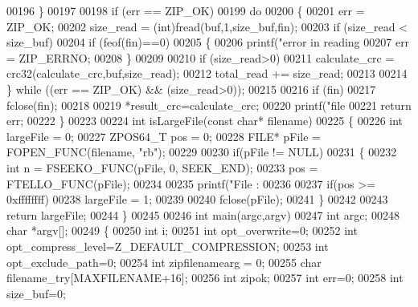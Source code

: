 \begin{DoxyCode}
00196    \}
00197 
00198     \textcolor{keywordflow}{if} (err == ZIP\_OK)
00199         \textcolor{keywordflow}{do}
00200         \{
00201             err = ZIP\_OK;
00202             size\_read = (int)fread(buf,1,size\_buf,fin);
00203             \textcolor{keywordflow}{if} (size\_read < size\_buf)
00204                 \textcolor{keywordflow}{if} (feof(fin)==0)
00205             \{
00206                 printf(\textcolor{stringliteral}{"error in reading %
00207                 err = ZIP\_ERRNO;
00208             \}
00209 
00210             \textcolor{keywordflow}{if} (size\_read>0)
00211                 calculate\_crc = crc32(calculate\_crc,buf,size\_read);
00212             total\_read += size\_read;
00213 
00214         \} \textcolor{keywordflow}{while} ((err == ZIP\_OK) && (size\_read>0));
00215 
00216     \textcolor{keywordflow}{if} (fin)
00217         fclose(fin);
00218 
00219     *result\_crc=calculate\_crc;
00220     printf(\textcolor{stringliteral}{"file %
00221     \textcolor{keywordflow}{return} err;
00222 \}
00223 
00224 \textcolor{keywordtype}{int} isLargeFile(\textcolor{keyword}{const} \textcolor{keywordtype}{char}* filename)
00225 \{
00226   \textcolor{keywordtype}{int} largeFile = 0;
00227   ZPOS64\_T pos = 0;
00228   FILE* pFile = FOPEN\_FUNC(filename, \textcolor{stringliteral}{"rb"});
00229 
00230   \textcolor{keywordflow}{if}(pFile != NULL)
00231   \{
00232     \textcolor{keywordtype}{int} n = FSEEKO\_FUNC(pFile, 0, SEEK\_END);
00233     pos = FTELLO\_FUNC(pFile);
00234 
00235                 printf(\textcolor{stringliteral}{"File : %
00236 
00237     \textcolor{keywordflow}{if}(pos >= 0xffffffff)
00238      largeFile = 1;
00239 
00240                 fclose(pFile);
00241   \}
00242 
00243  \textcolor{keywordflow}{return} largeFile;
00244 \}
00245 
00246 \textcolor{keywordtype}{int} main(argc,argv)
00247     \textcolor{keywordtype}{int} argc;
00248     \textcolor{keywordtype}{char} *argv[];
00249 \{
00250     \textcolor{keywordtype}{int} i;
00251     \textcolor{keywordtype}{int} opt\_overwrite=0;
00252     \textcolor{keywordtype}{int} opt\_compress\_level=Z\_DEFAULT\_COMPRESSION;
00253     \textcolor{keywordtype}{int} opt\_exclude\_path=0;
00254     \textcolor{keywordtype}{int} zipfilenamearg = 0;
00255     \textcolor{keywordtype}{char} filename\_try[MAXFILENAME+16];
00256     \textcolor{keywordtype}{int} zipok;
00257     \textcolor{keywordtype}{int} err=0;
00258     \textcolor{keywordtype}{int} size\_buf=0;
}}}
\end{DoxyCode}
